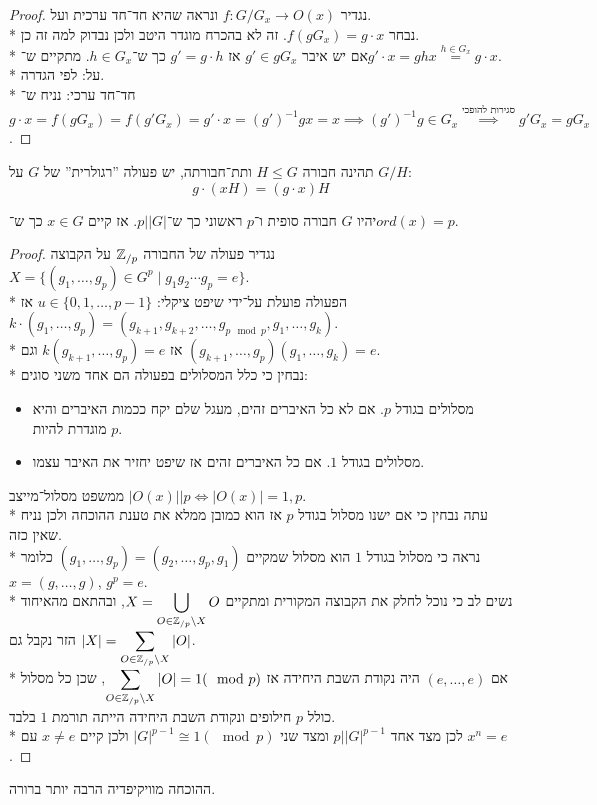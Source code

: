 \begin{proof}
	נגדיר $f : G/G_x \to O(x)$ ונראה שהיא חד־חד ערכית ועל.\\*
	נבחר $f(gG_x) = g \cdot x$. זה לא בהכרח מוגדר היטב ולכן נבדוק למה זה כן.\\*
	אם יש איבר $g' \in gG_x$ אז $g' = g \cdot h$ כך ש־$h \in G_x$. מתקיים ש־$g' \cdot x = g h x \overset{h \in G_x}{=} g \cdot x$.\\*
	על: לפי הגדרה. \\*
	חד־חד ערכי: נניח ש־$g \cdot x = f(g G_x) = f(g'G_x) = g' \cdot x = {(g')}^{-1} g x = x \implies {(g')}^{-1} g \in G_x \overset{\text{סגירות להופכי}}{\implies} g'G_x = g G_x$.
\end{proof}
\begin{example}
	תהינה חבורה $H \le G$ ותת־חבורתה, יש פעולה ''רגולרית'' של $G$ על $G / H$:
	\[
		g \cdot (x H) = (g \cdot x) H
	\]
\end{example}

\begin{theorem}
	יהיו $G$ חבורה סופית ו־$p$ ראשוני כך ש־$p \Big| |G|$. אז קיים $x \in G$ כך ש־$ord(x) = p$.
\end{theorem}
\begin{proof}
	נגדיר פעולה של החבורה $\mathbb{Z}_{/p}$ על הקבוצה $X = \{ (g_1, \dots, g_p) \in G^p \mid g_1g_2 \cdots g_p = e\}$. \\*
	הפעולה פועלת על־ידי שיפט ציקלי: $u \in \{0, 1, \dots, p - 1\}$ אז $k \cdot (g_1, \dots, g_p) = (g_{k + 1}, g_{k + 2}, \dots, g_{p \mod p}, g_{1}, \dots, g_k)$.\\*
	אז $k (g_{k + 1}, \dots, g_p) = e$ וגם $(g_{k + 1}, \dots, g_p)(g_1, \dots, g_k) = e$. \\*
	נבחין כי כלל המסלולים בפעולה הם אחד משני סוגים:
	\begin{itemize}
		\item מסלולים בגודל $p$. אם לא כל האיברים זהים, מעגל שלם יקח ככמות האיברים והיא מוגדרת להיות $p$.
		\item מסלולים בגודל $1$. אם כל האיברים זהים אז שיפט יחזיר את האיבר עצמו.
	\end{itemize}
	ממשפט מסלול־מייצב $|O(x)| \Big| p \iff |O(x)| = 1, p$.\\*
	עתה נבחין כי אם ישנו מסלול בגודל $p$ אז הוא כמובן ממלא את טענת ההוכחה ולכן נניח שאין כזה. \\*
	נראה כי מסלול בגודל $1$ הוא מסלול שמקיים $(g_1, \dots, g_p) = (g_2, \dots, g_p, g_1)$ כלומר $x = (g, \dots, g)$, $g^p = e$.\\*
	נשים לב כי נוכל לחלק את הקבוצה המקורית ומתקיים $X = \displaystyle \bigcup_{O \in \mathbb{Z}_{/p} \backslash X} O$, ובהתאם מהאיחוד הזר נקבל גם $|X| = \displaystyle \sum_{O \in \mathbb{Z}_{/p} \backslash X} |O|$. \\*
	אם $(e, \dots, e)$ היה נקודת השבת היחידה אז $\displaystyle \sum_{O \in \mathbb{Z}_{/p} \backslash X} |O| = 1 (\mod p)$, שכן כל מסלול כולל $p$ חילופים ונקודת השבת היחידה הייתה תורמת $1$ בלבד. \\*
	לכן מצד אחד $p \Big| |G|^{p - 1}$ ומצד שני $|G|^{p - 1} \cong 1 (\mod p)$ ולכן קיים $x \ne e$ עם $x^n = e$.
\end{proof}
\begin{remark}
	ההוכחה מוויקיפדיה הרבה יותר ברורה.
\end{remark}

